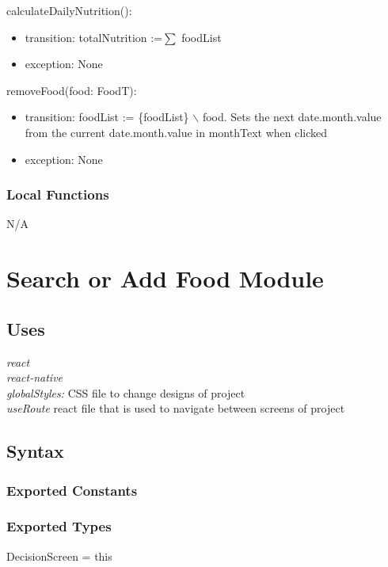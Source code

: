 \documentclass[12pt, titlepage]{article}
\begin{document}
\noindent calculateDailyNutrition():
\begin{itemize}
\item transition: totalNutrition :=$ \sum $ foodList
\item exception: None 
\end{itemize}

\noindent removeFood(food: FoodT):
\begin{itemize}
\item transition: foodList := \{foodList\} $\backslash$ food. Sets the next date.month.value from the current date.month.value in monthText when clicked
\item exception: None 
\end{itemize}

\subsubsection{Local Functions}

N/A

\section{Search or Add Food Module} \label{Module} 

\subsection{Uses}
{\textit{react}}\\
{\textit{react-native}}\\
{\textit{globalStyles:} CSS file to change designs of project}\\
{\textit{useRoute} react file that is used to navigate between screens of project}\\

\subsection{Syntax}

\subsubsection{Exported Constants}

\subsubsection{Exported Types}
DecisionScreen = this
\end{document}

